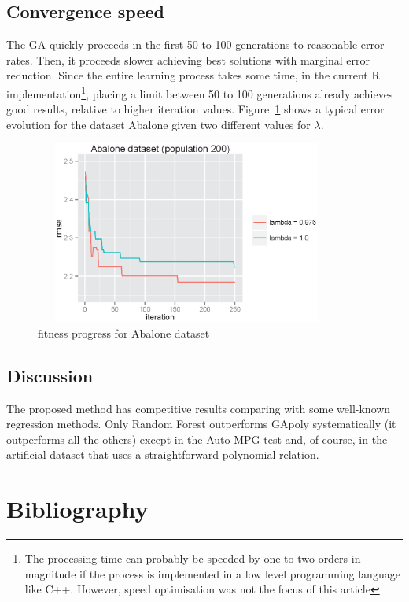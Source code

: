 \documentclass[a4paper, 12pt]{article}
\begin{document}

\subsection{Convergence speed}

The GA quickly proceeds in the first 50 to 100 generations to reasonable error rates. Then, it proceeds slower achieving best solutions with marginal error reduction. Since the entire learning process takes some time, in the current R implementation\footnote{The processing time can probably be speeded by one to two orders in magnitude if the process is implemented in a low level programming language like C++. However, speed optimisation was not the focus of this article}, placing a limit between 50 to 100 generations already achieves good results, relative to higher iteration values. Figure~\ref{Abalone_fitnessProgress} shows a typical error evolution for the dataset Abalone given two different values for $\lambda$.

\begin{figure}[htb]
	\begin{center}
		\includegraphics[height=6cm,width=10cm,angle=0]
			{figures/Abalone_fitnessProgress.eps}
		\caption{fitness progress for Abalone dataset}
		\label{Abalone_fitnessProgress}
	\end{center}
\end{figure}

\subsection{Discussion}

The proposed method has competitive results comparing with some well-known regression methods. Only Random Forest outperforms GApoly systematically (it outperforms all the others) except in the Auto-MPG test and, of course, in the artificial dataset that uses a straightforward polynomial relation. 

\section{Bibliography}



\end{document}
